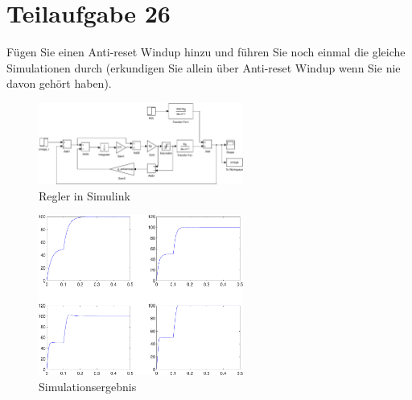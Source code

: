 \section{Teilaufgabe 26}
\begin{aufgabe}
    Fügen Sie einen Anti-reset Windup hinzu und führen Sie noch einmal die 
    gleiche Simulationen durch (erkundigen Sie allein über Anti-reset Windup 
    wenn Sie nie davon gehört haben).
\end{aufgabe}
\begin{figure}[h!]
    \centering
    \includegraphics[width=0.6\textwidth]{26/regler_antiwindup.pdf}
    \caption{Regler in Simulink}
    \label{fig:26}
\end{figure}
\begin{figure}[h!]
    \centering
    \includegraphics[width=0.6\textwidth]{26/regler_antiwindup_plot.pdf}
    \caption{Simulationsergebnis}
    \label{fig:26plot}
\end{figure}
